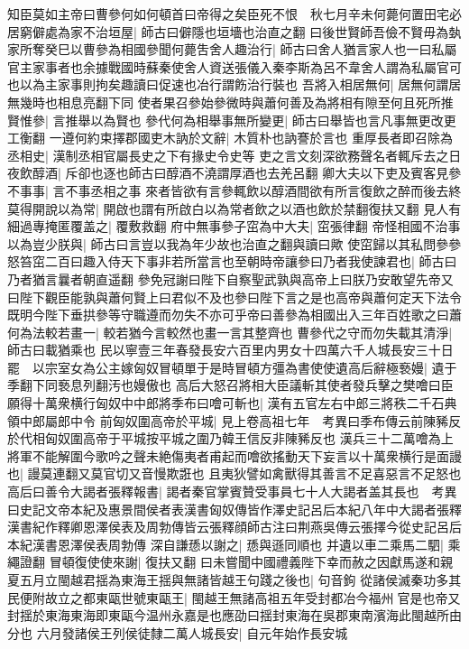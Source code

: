 知臣莫如主帝曰曹參何如何頓首曰帝得之矣臣死不恨　秋七月辛未何薨何置田宅必居窮僻處為家不治垣屋|{
	師古曰僻隱也垣墻也治直之翻}
曰後世賢師吾儉不賢毋為埶家所奪癸巳以曹參為相國參聞何薨吿舍人趣治行|{
	師古曰舍人猶言家人也一曰私屬官主家事者也余據戰國時蘇秦使舍人資送張儀入秦李斯為呂不韋舍人謂為私屬官可也以為主家事則拘矣趣讀曰促速也冶行謂飭治行裝也}
吾將入相居無何|{
	居無何謂居無幾時也相息亮翻下同}
使者果召參始參微時與蕭何善及為將相有隙至何且死所推賢惟參|{
	言推舉以為賢也}
參代何為相舉事無所變更|{
	師古曰舉皆也言凡事無更改更工衡翻}
一遵何約束擇郡國吏木訥於文辭|{
	木質朴也訥謇於言也}
重厚長者即召除為丞相史|{
	漢制丞相官屬長史之下有掾史令史等}
吏之言文刻深欲務聲名者輒斥去之日夜飲醇酒|{
	斥卻也逐也師古曰醇酒不澆謂厚酒也去羌呂翻}
卿大夫以下吏及賓客見參不事事|{
	言不事丞相之事}
來者皆欲有言參輒飲以醇酒間欲有所言復飲之醉而後去終莫得開說以為常|{
	開啟也謂有所啟白以為常者飲之以酒也飲於禁翻復扶又翻}
見人有細過專掩匿覆盖之|{
	覆敷救翻}
府中無事參子窋為中大夫|{
	窋張律翻}
帝怪相國不治事以為豈少朕與|{
	師古曰言豈以我為年少故也治直之翻與讀曰歟}
使窋歸以其私問參參怒笞窋二百曰趣入侍天下事非若所當言也至朝時帝讓參曰乃者我使諫君也|{
	師古曰乃者猶言曩者朝直遥翻}
參免冠謝曰陛下自察聖武孰與高帝上曰朕乃安敢望先帝又曰陛下觀臣能孰與蕭何賢上曰君似不及也參曰陛下言之是也高帝與蕭何定天下法令既明今陛下垂拱參等守職遵而勿失不亦可乎帝曰善參為相國出入三年百姓歌之曰蕭何為法較若畫一|{
	較若猶今言較然也畫一言其整齊也}
曹參代之守而勿失載其清淨|{
	師古曰載猶乘也}
民以寧壹三年春發長安六百里内男女十四萬六千人城長安三十日罷　以宗室女為公主嫁匈奴冒頓單于是時冒頓方彊為書使使遺高后辭極䙝嫚|{
	遺于季翻下同䙝息列翻汚也嫚傲也}
高后大怒召將相大臣議斬其使者發兵擊之樊噲曰臣願得十萬衆横行匈奴中中郎將季布曰噲可斬也|{
	漢有五官左右中郎三將秩二千石典領中郎屬郎中令}
前匈奴圍高帝於平城|{
	見上卷高祖七年　考異曰季布傳云前陳豨反於代相匈奴圍高帝于平城按平城之圍乃韓王信反非陳豨反也}
漢兵三十二萬噲為上將軍不能解圍今歌吟之聲未絶傷夷者甫起而噲欲搖動天下妄言以十萬衆横行是面謾也|{
	謾莫連翻又莫官切又音慢欺誑也}
且夷狄譬如禽獸得其善言不足喜惡言不足怒也高后曰善令大謁者張釋報書|{
	謁者秦官掌賓贊受事員七十人大謁者盖其長也　考異曰史記文帝本紀及惠景間侯者表漢書匈奴傳皆作澤史記呂后本紀八年中大謁者張釋漢書紀作釋卿恩澤侯表及周勃傳皆云張釋顔師古注曰荆燕吳傳云張擇今從史記呂后本紀漢書恩澤侯表周勃傳}
深自謙愻以謝之|{
	愻與遜同順也}
并遺以車二乘馬二駟|{
	乘繩證翻}
冒頓復使使來謝|{
	復扶又翻}
曰未嘗聞中國禮義陛下幸而赦之因獻馬遂和親　夏五月立閩越君揺為東海王揺與無諸皆越王句踐之後也|{
	句音鉤}
從諸侯滅秦功多其民便附故立之都東甌世號東甌王|{
	閩越王無諸高祖五年受封都冶今福州官是也帝又封揺於東海東海即東甌今温州永嘉是也應劭曰揺封東海在吳郡東南濱海此閩越所由分也}
六月發諸侯王列侯徒隸二萬人城長安|{
	自元年始作長安城}


